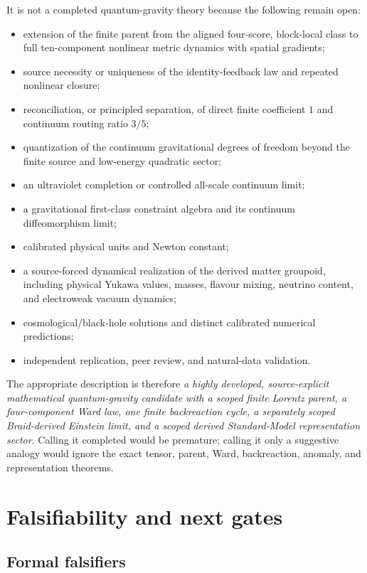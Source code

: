 \documentclass[11pt]{article}
\theoremstyle{definition}
\theoremstyle{remark}
\begin{document}
It is not a completed quantum-gravity theory because the following remain open:
\begin{itemize}
\item extension of the finite parent from the aligned four-score, block-local class to full ten-component nonlinear metric dynamics with spatial gradients;
\item source necessity or uniqueness of the identity-feedback law and repeated nonlinear closure;
\item reconciliation, or principled separation, of direct finite coefficient $1$ and continuum routing ratio $3/5$;
\item quantization of the continuum gravitational degrees of freedom beyond the finite source and low-energy quadratic sector;
\item an ultraviolet completion or controlled all-scale continuum limit;
\item a gravitational first-class constraint algebra and its continuum diffeomorphism limit;
\item calibrated physical units and Newton constant;
\item a source-forced dynamical realization of the derived matter groupoid, including physical Yukawa values, masses, flavour mixing, neutrino content, and electroweak vacuum dynamics;
\item cosmological/black-hole solutions and distinct calibrated numerical predictions;
\item independent replication, peer review, and natural-data validation.
\end{itemize}

The appropriate description is therefore \emph{a highly developed, source-explicit mathematical quantum-gravity candidate with a scoped finite Lorentz parent, a four-component Ward law, one finite backreaction cycle, a separately scoped Braid-derived Einstein limit, and a scoped derived Standard-Model representation sector}. Calling it completed would be premature; calling it only a suggestive analogy would ignore the exact tensor, parent, Ward, backreaction, anomaly, and representation theorems.

\section{Falsifiability and next gates}

\subsection{Formal falsifiers}
\end{document}
